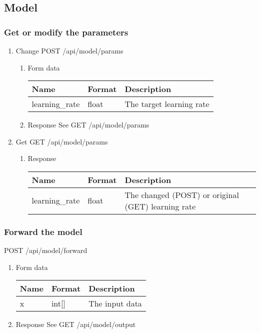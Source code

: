 \documentclass[11pt]{article}
\begin{document}
\subsection{Model}
\label{sec:org79041a1}
\subsubsection{Get or modify the parameters}
\label{sec:org806c4db}
\begin{enumerate}
\item Change
\label{sec:org49c27e7}
POST /api/model/params
\begin{enumerate}
\item Form data
\label{sec:org5265526}
\begin{center}
\begin{tabular}{lll}
Name & Format & Description\\
\hline
learning\_rate & float & The target learning rate\\
\end{tabular}
\end{center}
\item Response
\label{sec:orgc14215a}
See GET /api/model/params
\end{enumerate}

\item Get
\label{sec:orgc377ffd}
GET /api/model/params
\begin{enumerate}
\item Response
\label{sec:org4ca6f7d}
\begin{center}
\begin{tabular}{lll}
Name & Format & Description\\
\hline
learning\_rate & float & The changed (POST) or original (GET) learning rate\\
\end{tabular}
\end{center}
\end{enumerate}
\end{enumerate}
\subsubsection{Forward the model}
\label{sec:orgcf08aeb}
POST /api/model/forward
\begin{enumerate}
\item Form data
\label{sec:orgc49db25}
\begin{center}
\begin{tabular}{lll}
Name & Format & Description\\
\hline
x & int[] & The input data\\
\end{tabular}
\end{center}
\item Response
\label{sec:orga87a324}
See GET /api/model/output
\end{enumerate}
\end{document}
